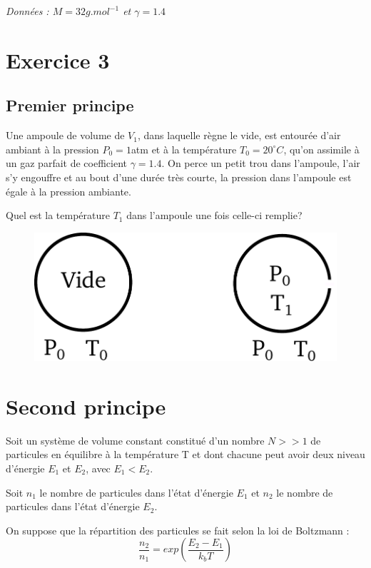\documentclass{report}
\begin{document}
\textit{Données : $M = 32g.mol^{-1}$ et $\gamma=1.4$}

\newpage

\section*{Exercice 3}

\subsection*{Premier principe}

Une ampoule de volume de $V_1$, dans laquelle règne le vide, est entourée d'air ambiant à la pression $P_{0} = 1$atm et à la température $T_{0}=20^{\circ}C$, qu'on assimile à un gaz parfait de coefficient $\gamma=1.4$. On perce un petit trou dans l'ampoule, l'air s'y engouffre et au bout d'une durée très courte, la pression dans l'ampoule est égale à la pression ambiante.

Quel est la température $T_{1}$ dans l'ampoule une fois celle-ci remplie?

\begin{figure}[!h]
\centering
\includegraphics[width=0.5\linewidth]{ampoule.pdf}
\end{figure}

\section*{Second principe}

Soit un système de volume constant constitué d'un nombre $N>>1$ de particules en équilibre à la température T et dont chacune peut avoir deux niveau d'énergie $E_{1}$ et $E_{2}$, avec $E_{1}<E_{2}$.

Soit $n_{1}$ le nombre de particules dans l'état d'énergie $E_{1}$ et $n_{2}$ le nombre de particules dans l'état d'énergie $E_{2}$.

On suppose que la répartition des particules se fait selon la loi de Boltzmann :
\begin{equation}
\frac{n_{2}}{n_{1}}=exp\left( \frac{E_{2}-E_{1}}{k_{b}T}\right) 
\end{equation}
\end{document}
